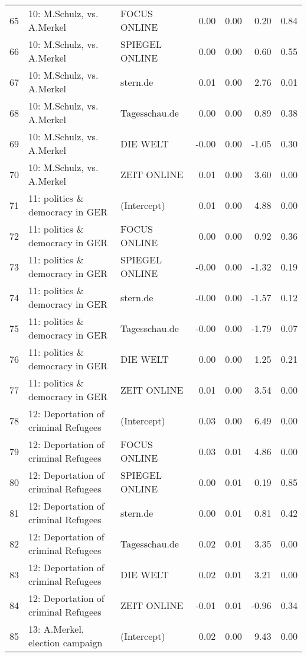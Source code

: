 \begin{table}[ht]
{\begin{tabular}{rllrrrr}
  65 & 10: M.Schulz, vs. A.Merkel & FOCUS ONLINE & 0.00 & 0.00 & 0.20 & 0.84 \\ 
  66 & 10: M.Schulz, vs. A.Merkel & SPIEGEL ONLINE & 0.00 & 0.00 & 0.60 & 0.55 \\ 
  67 & 10: M.Schulz, vs. A.Merkel & stern.de & 0.01 & 0.00 & 2.76 & 0.01 \\ 
  68 & 10: M.Schulz, vs. A.Merkel & Tagesschau.de & 0.00 & 0.00 & 0.89 & 0.38 \\ 
  69 & 10: M.Schulz, vs. A.Merkel & DIE WELT & -0.00 & 0.00 & -1.05 & 0.30 \\ 
  70 & 10: M.Schulz, vs. A.Merkel & ZEIT ONLINE & 0.01 & 0.00 & 3.60 & 0.00 \\ 
  71 & 11: politics \& democracy in GER & (Intercept) & 0.01 & 0.00 & 4.88 & 0.00 \\ 
  72 & 11: politics \& democracy in GER & FOCUS ONLINE & 0.00 & 0.00 & 0.92 & 0.36 \\ 
  73 & 11: politics \& democracy in GER & SPIEGEL ONLINE & -0.00 & 0.00 & -1.32 & 0.19 \\ 
  74 & 11: politics \& democracy in GER & stern.de & -0.00 & 0.00 & -1.57 & 0.12 \\ 
  75 & 11: politics \& democracy in GER & Tagesschau.de & -0.00 & 0.00 & -1.79 & 0.07 \\ 
  76 & 11: politics \& democracy in GER & DIE WELT & 0.00 & 0.00 & 1.25 & 0.21 \\ 
  77 & 11: politics \& democracy in GER & ZEIT ONLINE & 0.01 & 0.00 & 3.54 & 0.00 \\ 
  78 & 12: Deportation of criminal Refugees & (Intercept) & 0.03 & 0.00 & 6.49 & 0.00 \\ 
  79 & 12: Deportation of criminal Refugees & FOCUS ONLINE & 0.03 & 0.01 & 4.86 & 0.00 \\ 
  80 & 12: Deportation of criminal Refugees & SPIEGEL ONLINE & 0.00 & 0.01 & 0.19 & 0.85 \\ 
  81 & 12: Deportation of criminal Refugees & stern.de & 0.00 & 0.01 & 0.81 & 0.42 \\ 
  82 & 12: Deportation of criminal Refugees & Tagesschau.de & 0.02 & 0.01 & 3.35 & 0.00 \\ 
  83 & 12: Deportation of criminal Refugees & DIE WELT & 0.02 & 0.01 & 3.21 & 0.00 \\ 
  84 & 12: Deportation of criminal Refugees & ZEIT ONLINE & -0.01 & 0.01 & -0.96 & 0.34 \\ 
  85 & 13: A.Merkel, election campaign & (Intercept) & 0.02 & 0.00 & 9.43 & 0.00 \\ 

\end{tabular}}
\end{table}
